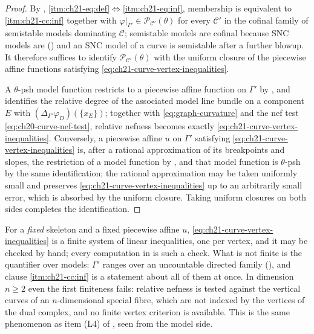 \begin{proof}
By ,
\cref{itm:ch21-eq:def}\(\Leftrightarrow\)\cref{itm:ch21-eq:inf}, membership is
equivalent to \cref{itm:ch21-cc:inf} together with
\(\varphi|_{\Gamma'}\in\mathcal P_{\mathcal C'}(\theta)\) for every
\(\mathcal C'\) in the cofinal family of semistable models dominating
\(\mathcal C\); semistable models are cofinal because SNC models are
() and an SNC model of a curve is semistable after a
further blowup.  It therefore suffices to identify
\(\mathcal P_{\mathcal C'}(\theta)\) with the uniform closure of the
piecewise affine functions satisfying
\eqref{eq:ch21-curve-vertex-inequalities}.

A \(\theta\)-psh model function restricts to a piecewise affine function on
\(\Gamma'\) by , and
 identifies the relative degree of the associated
model line bundle on a component \(E\) with
\((\Delta_{\Gamma'}\varphi_D)(\{x_E\})\); together with
\eqref{eq:graph-curvature} and the nef test
\eqref{eq:ch20-curve-nef-test}, relative nefness becomes exactly
\eqref{eq:ch21-curve-vertex-inequalities}.  Conversely, a piecewise affine
\(u\) on \(\Gamma'\) satisfying
\eqref{eq:ch21-curve-vertex-inequalities} is, after a rational
approximation of its breakpoints and slopes, the restriction of a model
function by , and that model function is
\(\theta\)-psh by the same identification; the rational approximation may be
taken uniformly small and preserves
\eqref{eq:ch21-curve-vertex-inequalities} up to an arbitrarily small error,
which is absorbed by the uniform closure.  Taking uniform closures on both
sides completes the identification.
\end{proof}

\begin{remark}
\label{rem:ch21-curve-finite}
For a \emph{fixed} skeleton and a fixed piecewise affine \(u\),
\eqref{eq:ch21-curve-vertex-inequalities} is a finite system of linear
inequalities, one per vertex, and it may be checked by hand; every
computation in  is such a check.  What is not finite is
the quantifier over models: \(\Gamma'\) ranges over an uncountable directed
family (), and clause
\cref{itm:ch21-cc:inf} is a statement about all of them at once.  In
dimension \(n\geq2\) even the first finiteness fails: relative nefness is
tested against the vertical curves of an \(n\)-dimensional special fibre,
which are not indexed by the vertices of the dual complex, and no finite
vertex criterion is available.  This is the same phenomenon as item (L4) of
, seen from the model side.
\end{remark}

